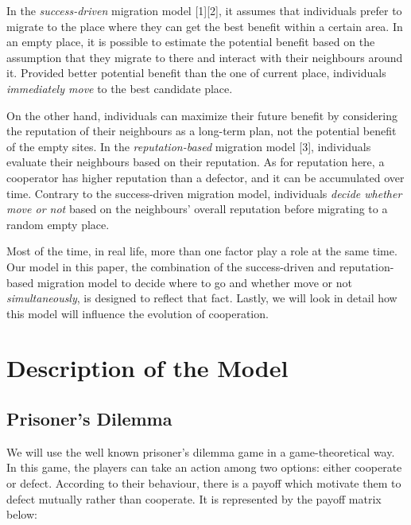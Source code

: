 \documentclass[11pt]{article}
\begin{document}
In the \textit{success-driven} migration model [1][2], it assumes that individuals prefer to migrate to the place where they can get the best benefit within a certain area. In an empty place, it is possible to estimate the potential benefit based on the assumption that they migrate to there and interact with their neighbours around it. Provided better potential benefit than the one of current place, individuals \textit{immediately move} to the best candidate place.  

On the other hand, individuals can maximize their future benefit by considering the reputation of their neighbours as a long-term plan, not the potential benefit of the empty sites. In the \textit{reputation-based} migration model [3], individuals evaluate their neighbours based on their reputation. As for reputation here, a cooperator has higher reputation than a defector, and it can be accumulated over time. Contrary to the success-driven migration model, individuals \textit{decide whether move or not} based on the neighbours' overall reputation before migrating to a random empty place.

Most of the time, in real life, more than one factor play a role at the same time. Our model in this paper, the combination of the success-driven and reputation-based migration model to decide where to go and whether move or not \textit{simultaneously}, is designed to reflect that fact. Lastly, we will look in detail how this model will influence the evolution of cooperation.


\section{Description of the Model}
\subsection{Prisoner's Dilemma}

We will use the well known prisoner's dilemma game in a game-theoretical way. In this game, the players can take an action among two options: either cooperate or defect. According to their behaviour, there is a payoff which motivate them to defect mutually rather than cooperate. It is represented by the payoff matrix below:
\end{document}
